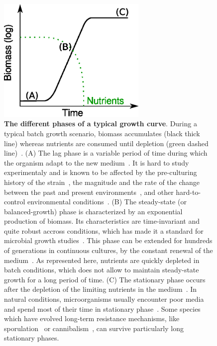 \begin{figure}[p]
\centering
\includegraphics[height=6cm]{./Fig/Chapter1/growth_curve}
\caption{
\textbf{The different phases of a typical growth curve}.
During a typical batch growth scenario, biomass accumulates (black thick line) whereas nutrients are consumed until depletion (green dashed line)~\cite{schaechter_microbe_2006}.
(A) The lag phase is a variable period of time during which the organism adapt to the new medium~\cite{swinnen_predictive_2004}.
It is hard to study experimentaly and is known to be affected by the pre-culturing history of the strain~\cite{ng_damage_1962,dufrenne_effect_1997,shaw_effect_1967}, the magnitude and the rate of the change between the past and present environments~\cite{mcmeekin_predictive_2002}, and other hard-to-control environmental conditions~\cite{cheroutre-vialette_application_2002}.
(B) The steady-state (or balanced-growth) phase is characterized by an exponential production of biomass.
Its characteristics are time-invariant and quite robust accross conditions, which has made it a standard for microbial growth studies~\cite{schaechter_microbe_2006}.
This phase can be extended for hundreds of generations in continuous cultures, by the constant renewal of the medium~\cite{borirak_molecular_2014,herbert_continuous_1956,wang_robust_2010}.
As represented here, nutrients are quickly depleted in batch conditions, which does not allow to maintain steady-state growth for a long period of time.
(C) The stationary phase occurs after the depletion of the limiting nutrients in the medium~\cite{chubukov_environmental_2014,schaechter_microbe_2006}.
In natural conditions, microorganisms usually encounter poor media and spend most of their time in stationary phase~\cite{mcarthur_microbial_2006,menge_nitrogen_2012,hobbie_microbes_2013}.
Some species which have evolved long-term resistance mechanisms, like sporulation~\cite{stragier_molecular_1996} or cannibalism~\cite{gonzalez-pastor_cannibalism:_2011}, can survive particularly long stationary phases.
}
\label{fig:growth_curve}
\end{figure}

